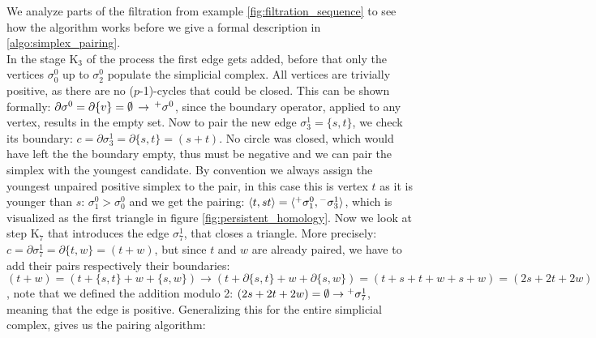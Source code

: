 We analyze parts of the filtration from example \ref{fig:filtration_sequence} to see how the algorithm works before we give a formal description in \ref{algo:simplex_pairing}.\\
In the stage $\mathrm{K}_{3}$ of the process the first edge gets added, before that only the vertices $\sigma^{0}_{0}$ up to $\sigma^{0}_{2}$ populate the simplicial complex. 
All vertices are trivially positive, as there are no ($p$-1)-cycles that could be closed.
This can be shown formally: $\partial \sigma^{0} = \partial \{v\} = \emptyset \,\rightarrow \,\Prefix^{+}{\sigma^{0}}$, since the boundary operator, applied to any vertex, results in the empty set.
Now to pair the new edge $\sigma^{1}_{3} = \{s,t\}$, we check its boundary: $c = \partial \sigma^{1}_{3} = \partial \{s,t\} = (s+t)$.
No circle was closed, which would have left the the boundary empty, thus must be negative and we can pair the simplex with the youngest candidate.
By convention we always assign the youngest unpaired positive simplex to the pair, in this case this is vertex $t$ as it is younger than $s$: $\sigma^{0}_{1} > \sigma^{0}_{0}$ and we get the pairing: $\langle t, st \rangle = \langle \Prefix^{+}{\sigma^{0}_{1}}, \Prefix^{-}{\sigma^{1}_{3}} \rangle$, which is visualized as the first triangle in figure \ref{fig:persistent_homology}.
Now we look at step $\mathrm{K}_{7}$ that introduces the edge $\sigma^{1}_{7}$, that closes a triangle.
More precisely: $c = \partial \sigma^{1}_{7} = \partial \{t, w\} = (t + w)$, but since $t$ and $w$ are already paired, we have to add their pairs respectively their boundaries: $(t + w) = (t + \{s,t\} + w + \{s,w\}) \rightarrow (t + \partial \{s,t\} + w + \partial \{s,w\}) = (t + s + t + w + s + w) = (2s + 2t +2w)$, note that we defined the addition modulo 2: $(2s + 2t +2w) = \emptyset \rightarrow \Prefix^{+}{\sigma^{1}_{7}}$, meaning that the edge is positive.
Generalizing this for the entire simplicial complex, gives us the pairing algorithm:

